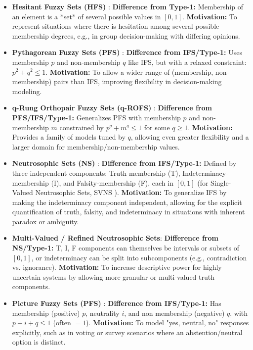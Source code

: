 \begin{itemize}
    \item \textbf{Hesitant Fuzzy Sets (HFS)} \cite{Torra2010}: \textbf{Difference from Type-1:} Membership of an element is a *set* of several possible values in $[0,1]$. \textbf{Motivation:} To represent situations where there is hesitation among several possible membership degrees, e.g., in group decision-making with differing opinions.

    \item \textbf{Pythagorean Fuzzy Sets (PFS)} \cite{Yager2013_Pythagorean}: \textbf{Difference from IFS/Type-1:} Uses membership $p$ and non-membership $q$ like IFS, but with a relaxed constraint: $p^2 + q^2 \leq 1$. \textbf{Motivation:} To allow a wider range of (membership, non-membership) pairs than IFS, improving flexibility in decision-making modeling.

    \item \textbf{q-Rung Orthopair Fuzzy Sets (q-ROFS)} \cite{Yager2017_qRung}: \textbf{Difference from PFS/IFS/Type-1:} Generalizes PFS with membership $p$ and non-membership $m$ constrained by $p^q + m^q \leq 1$ for some $q \ge 1$. \textbf{Motivation:} Provides a family of models tuned by $q$, allowing even greater flexibility and a larger domain for membership/non-membership values.

    \item \textbf{Neutrosophic Sets (NS)} \cite{Smarandache1998_Neutrosophic}: \textbf{Difference from IFS/Type-1:} Defined by three independent components: Truth-membership (T), Indeterminacy-membership (I), and Falsity-membership (F), each in $[0,1]$ (for Single-Valued Neutrosophic Sets, SVNS \cite{Wang2010_SVNS}). \textbf{Motivation:} To generalize IFS by making the indeterminacy component independent, allowing for the explicit quantification of truth, falsity, and indeterminacy in situations with inherent paradox or ambiguity.

    \item \textbf{Multi-Valued / Refined Neutrosophic Sets}: \textbf{Difference from NS/Type-1:} T, I, F components can themselves be intervals or subsets of $[0,1]$, or indeterminacy can be split into subcomponents (e.g., contradiction vs. ignorance). \textbf{Motivation:} To increase descriptive power for highly uncertain systems by allowing more granular or multi-valued truth components.

    \item \textbf{Picture Fuzzy Sets (PFS)} \cite{Cuong2013_Picture}: \textbf{Difference from IFS/Type-1:} Has membership (positive) $p$, neutrality $i$, and non membership (negative) $q$, with $p+i+q \leq 1$ (often $=1$). \textbf{Motivation:} To model "yes, neutral, no" responses explicitly, such as in voting or survey scenarios where an abstention/neutral option is distinct.


\end{itemize}

